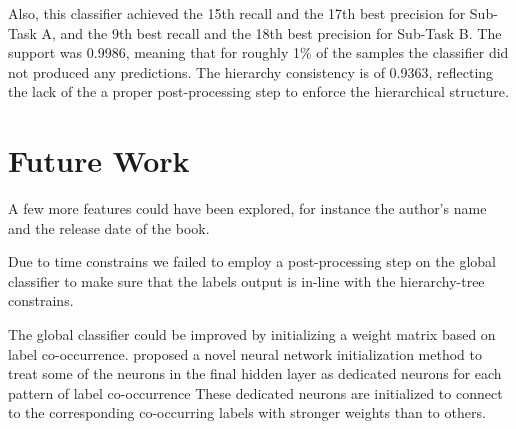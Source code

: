 \documentclass[11pt,a4paper]{article}
\begin{document}
Also, this classifier achieved the 15th recall and the 17th best precision
for Sub-Task A, and the 9th best recall and the 18th best precision for Sub-Task B.
The support was 0.9986, meaning that for roughly 1\% of the samples the classifier
did not produced any predictions. The hierarchy consistency is of 0.9363, reflecting
the lack of the a proper post-processing step to enforce the hierarchical structure.





\section{Future Work}\label{future}


A few more features could have been explored, for instance the author's name
and the release date of the book.

Due to time constrains we failed to employ a post-processing step on the global
classifier to make sure that the labels output is in-line with the hierarchy-tree
constrains.

The global classifier could be improved by initializing a weight matrix based on
label co-occurrence. \citet{kurata-etal-2016-improved} proposed a novel neural
network initialization method to treat some of the neurons in the final
hidden layer as dedicated neurons for each pattern of label co-occurrence
These dedicated neurons are initialized to connect to the corresponding
co-occurring labels with stronger weights than to others.



\end{document}
